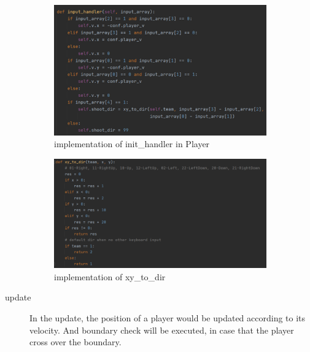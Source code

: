\documentclass[14pt]{extarticle}
\begin{document}
\begin{description}
\begin{figure}[H]
\begin{center}
			\includegraphics[width=0.9\textwidth]{Player_input}
			\caption{implementation of init\_handler in Player}
		\end{center}
	\end{figure}
	\begin{figure}[H]
	\begin{center}
			\includegraphics[width=0.9\textwidth]{xy_to_dir}
			\caption{implementation of xy\_to\_dir}
		\end{center}
	\end{figure}
	\item[update]
	In the update, the position of a player would be updated according to its velocity. And boundary check will be executed, in case that the player cross over the boundary. 
	\begin{figure}[H]
		\begin{center}

\end{center}
\end{figure}
\end{description}
\end{document}
